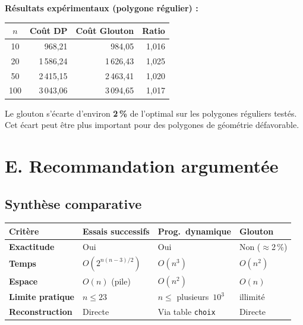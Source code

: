 \documentclass[12pt,a4paper]{article}
\begin{document}
\textbf{Résultats expérimentaux (polygone régulier) :}

\begin{center}
\begin{tabular}{crrr}
\toprule
$n$ & Coût DP & Coût Glouton & Ratio \\
\midrule
  10 &   968,21 &    984,05 & 1,016 \\
  20 & 1\,586,24 &  1\,626,43 & 1,025 \\
  50 & 2\,415,15 &  2\,463,41 & 1,020 \\
 100 & 3\,043,06 &  3\,094,65 & 1,017 \\
\bottomrule
\end{tabular}
\end{center}

Le glouton s'écarte d'environ \textbf{2\,\%} de l'optimal sur les polygones réguliers
testés. Cet écart peut être plus important pour des polygones de géométrie défavorable.

\clearpage
\section{E. Recommandation argumentée}

\subsection*{Synthèse comparative}

\begin{center}
\begin{tabularx}{\textwidth}{lXXX}
\toprule
Critère & Essais successifs & Prog.\ dynamique & Glouton \\
\midrule
\textbf{Exactitude}         & Oui                & Oui                     & Non ($\approx$2\,\%) \\
\textbf{Temps}              & $O(2^{n(n-3)/2})$  & $O(n^3)$       & $O(n^2)$ \\
\textbf{Espace}             & $O(n)$ (pile)       & $O(n^2)$               & $O(n)$ \\
\textbf{Limite pratique}    & $n \leq 23$         & $n \leq$ plusieurs~$10^3$ & illimité \\
\textbf{Reconstruction}     & Directe            & Via table \texttt{choix} & Directe \\
\bottomrule
\end{tabularx}
\end{center}
\end{document}
